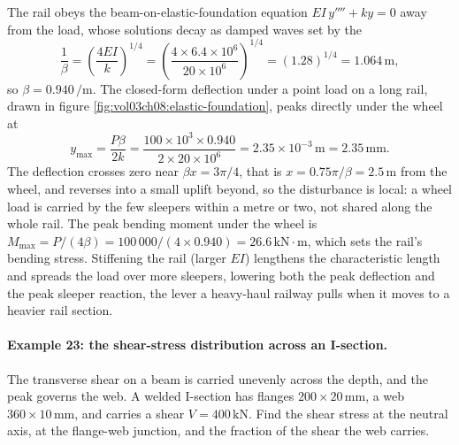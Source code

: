 The rail obeys the beam-on-elastic-foundation equation $EI\,y'''' + k y
= 0$ away from the load, whose solutions decay as damped waves set by
the 
\[
\frac{1}{\beta} = \left(\frac{4EI}{k}\right)^{1/4}
= \left(\frac{4 \times 6.4 \times 10^6}{20 \times 10^6}\right)^{1/4}
= (1.28)^{1/4} = 1.064\,\si{\meter},
\]
so $\beta = 0.940\,\si{\per\meter}$. The closed-form deflection under a
point load on a long rail, drawn in figure
\ref{fig:vol03ch08:elastic-foundation}, peaks directly under the wheel
at
\[
y_{\max} = \frac{P\beta}{2k}
= \frac{100 \times 10^3 \times 0.940}{2 \times 20 \times 10^6}
= 2.35 \times 10^{-3}\,\si{\meter} = 2.35\,\si{\milli\meter}.
\]
The deflection crosses zero near $\beta x = 3\pi/4$, that is $x =
0.75\pi/\beta = 2.5\,\si{\meter}$ from the wheel, and reverses into a
small uplift beyond, so the disturbance is local: a wheel load is
carried by the few sleepers within a metre or two, not shared along the
whole rail. The peak bending moment under the wheel is $M_{\max} =
P/(4\beta) = 100\,000/(4 \times 0.940) = 26.6\,\text{kN}\cdot\text{m}$,
which sets the rail's bending stress. Stiffening the rail (larger $EI$)
lengthens the characteristic length and spreads the load over more
sleepers, lowering both the peak deflection and the peak sleeper
reaction, the lever a heavy-haul railway pulls when it moves to a
heavier rail section.



\paragraph{Example 23: the shear-stress distribution across an
I-section.} The transverse shear on a beam is carried unevenly across
the depth, and the peak governs the web. A welded I-section has flanges
$200 \times 20\,\si{\milli\meter}$, a web $360 \times 10\,\si{\milli
\meter}$, and carries a shear $V = 400\,\text{kN}$. Find the shear
stress at the neutral axis, at the flange-web junction, and the fraction
of the shear the web carries.

